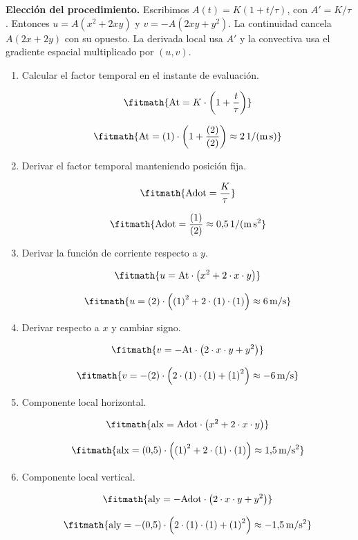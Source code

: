 \noindent\textbf{Elección del procedimiento.} Escribimos $A(t)=K(1+t/\tau)$, con $A\prime=K/\tau$. Entonces $u=A(x^2+2xy)$ y $v=-A(2xy+y^2)$. La continuidad cancela $A(2x+2y)$ con su opuesto. La derivada local usa $A\prime$ y la convectiva usa el gradiente espacial multiplicado por $(u,v)$.

\begin{enumerate}

\item Calcular el factor temporal en el instante de evaluación.

\[\fitmath{\mathrm{At}=K\cdot \left(1+\frac{t}{\tau}\right)}\]

\[\fitmath{\mathrm{At}=(1)\cdot \left(1+\frac{(2)}{(2)}\right)\approx 2\,\mathrm{1/(m\,s)}}\]

\item Derivar el factor temporal manteniendo posición fija.

\[\fitmath{\mathrm{Adot}=\frac{K}{\tau}}\]

\[\fitmath{\mathrm{Adot}=\frac{(1)}{(2)}\approx 0{,}5\,\mathrm{1/(m\,s^{2}}}\]

\item Derivar la función de corriente respecto a $y$.

\[\fitmath{u=\mathrm{At}\cdot \left({x}^{2}+2\cdot x\cdot y\right)}\]

\[\fitmath{u=(2)\cdot \left({(1)}^{2}+2\cdot (1)\cdot (1)\right)\approx 6\,\mathrm{m/s}}\]

\item Derivar respecto a $x$ y cambiar signo.

\[\fitmath{v=-\mathrm{At}\cdot \left(2\cdot x\cdot y+{y}^{2}\right)}\]

\[\fitmath{v=-(2)\cdot \left(2\cdot (1)\cdot (1)+{(1)}^{2}\right)\approx -6\,\mathrm{m/s}}\]

\item Componente local horizontal.

\[\fitmath{\mathrm{alx}=\mathrm{Adot}\cdot \left({x}^{2}+2\cdot x\cdot y\right)}\]

\[\fitmath{\mathrm{alx}=(0{,}5)\cdot \left({(1)}^{2}+2\cdot (1)\cdot (1)\right)\approx 1{,}5\,\mathrm{m/s^{2}}}\]

\item Componente local vertical.

\[\fitmath{\mathrm{aly}=-\mathrm{Adot}\cdot \left(2\cdot x\cdot y+{y}^{2}\right)}\]

\[\fitmath{\mathrm{aly}=-(0{,}5)\cdot \left(2\cdot (1)\cdot (1)+{(1)}^{2}\right)\approx -1{,}5\,\mathrm{m/s^{2}}}\]


\end{enumerate}
